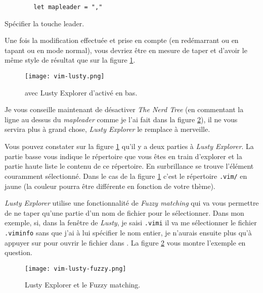\begin{listing}[H]

    \begin{verbatim}
        let mapleader = ","
    \end{verbatim}
    \caption{Spécifier la touche leader.}
    \label{code:leader}
\end{listing}

Une fois la modification effectuée et prise en compte (en redémarrant \vim ou en tapant  ou  en mode normal), vous devriez être en mesure de taper  et d'avoir le même style de résultat que sur la figure \ref{fig:vim-lusty}.

\begin{figure}%
  \texttt{[image: vim-lusty.png]}
  \caption{\vim avec Lusty Explorer d'activé en bas.}
  \label{fig:vim-lusty}
\end{figure}

Je vous conseille maintenant de désactiver \emph{The Nerd Tree} (en commentant la ligne au dessus du \emph{mapleader} comme je l'ai fait dans la figure \ref{fig:vim-lusty-fuzzy}), il ne vous servira plus à grand chose, \emph{Lusty Explorer} le remplace à merveille.

Vous pouvez constater sur la figure \ref{fig:vim-lusty} qu'il y a deux parties à \emph{Lusty Explorer}. La partie basse vous indique le répertoire que vous êtes en train d'explorer et la partie haute liste le contenu de ce répertoire. En surbrillance se trouve l'élément couramment sélectionné. Dans le cas de la figure \ref{fig:vim-lusty} c'est le répertoire \Verb|.vim/| en jaune  (la couleur pourra être différente en fonction de votre thème).

\emph{Lusty Explorer} utilise une fonctionnalité de \emph{Fuzzy matching} qui va vous permettre de ne taper qu'une partie d'un nom de fichier pour le sélectionner. Dans mon exemple, si, dans la fenêtre de \emph{Lusty}, je saisi \Verb|.vimi| il va me sélectionner le fichier \Verb|.viminfo| sans que j'ai à lui spécifier le nom entier, je n'aurais ensuite plus qu'à appuyer sur \ttenter pour ouvrir le fichier dans \vim. La figure \ref{fig:vim-lusty-fuzzy} vous montre l'exemple en question.

\begin{figure}%
  \texttt{[image: vim-lusty-fuzzy.png]}
  \caption{Lusty Explorer et le Fuzzy matching.}
  \label{fig:vim-lusty-fuzzy}
\end{figure}

